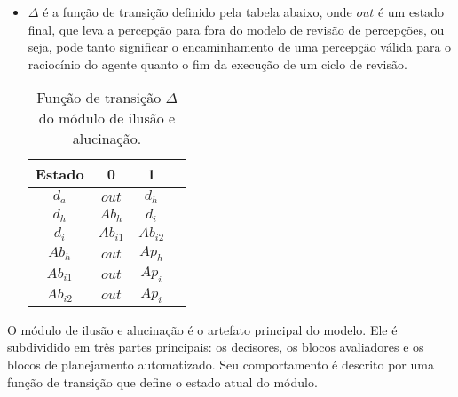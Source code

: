 \begin{definition}
\begin{itemize}
        \item $\Delta$ é a função de transição definido pela tabela abaixo, onde $out$ é um estado final, que leva a percepção para fora do modelo de revisão de percepções, ou seja, pode tanto significar o encaminhamento de uma percepção válida para o raciocínio do agente quanto o fim da execução de um ciclo de revisão.
        
            \begin{table}[htb]
                \caption{Função de transição $\Delta$ do módulo de ilusão e alucinação.}
                \centering
                \begin{tabular}{c c c c} 
                    \toprule
                    \textbf{Estado} & \textbf{0} & \textbf{1} \\
                    \midrule
                    $d_{a}$     & $out$     & $d_{h}$       \\
                    $d_{h}$     & $Ab_{h}$  & $d_{i}$       \\
                    $d_{i}$     & $Ab_{i1}$ & $Ab_{i2}$     \\
                    $Ab_{h}$    & $out$     & $Ap_{h}$      \\
                    $Ab_{i1}$   & $out$     & $Ap_{i}$      \\
                    $Ab_{i2}$   & $out$     & $Ap_{i}$      \\
                    \bottomrule
                \end{tabular}
                \label{transition-table}
                
            \end{table}
    \end{itemize}{}
\end{definition}{}

O módulo de ilusão e alucinação é o artefato principal do modelo. Ele é subdividido em três partes principais: os decisores, os blocos avaliadores e os blocos de planejamento automatizado. Seu comportamento é descrito por uma função de transição que define o estado atual do módulo.

\vspace{0.2cm}

